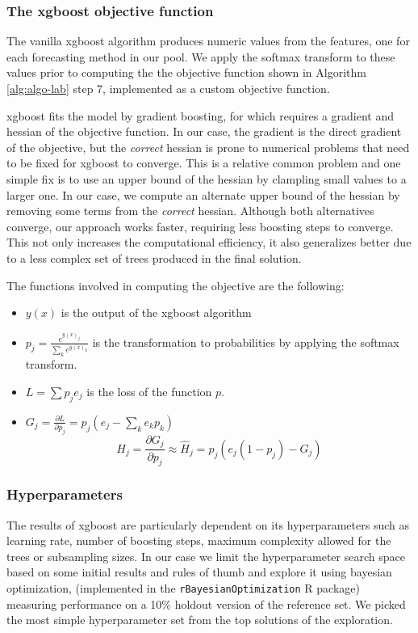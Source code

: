 \documentclass[11pt,a4paper,]{article}
\providecommand{\tightlist}{%
  \setlength{\itemsep}{0pt}\setlength{\parskip}{0pt}}
\theoremstyle{definition}
\theoremstyle{definition}
\theoremstyle{definition}
\theoremstyle{remark}
\begin{document}
\subsubsection{The xgboost objective
function}\label{the-xgboost-objective-function}

The vanilla xgboost algorithm produces numeric values from the features,
one for each forecasting method in our pool. We apply the softmax
transform to these values prior to computing the the objective function
shown in Algorithm \ref{alg:algo-lab} step 7, implemented as a custom
objective function.

xgboost fits the model by gradient boosting, for which requires a
gradient and hessian of the objective function. In our case, the
gradient is the direct gradient of the objective, but the \emph{correct}
hessian is prone to numerical problems that need to be fixed for xgboost
to converge. This is a relative common problem and one simple fix is to
use an upper bound of the hessian by clampling small values to a larger
one. In our case, we compute an alternate upper bound of the hessian by
removing some terms from the \emph{correct} hessian. Although both
alternatives converge, our approach works faster, requiring less
boosting steps to converge. This not only increases the computational
efficiency, it also generalizes better due to a less complex set of
trees produced in the final solution.

The functions involved in computing the objective are the following:

\begin{itemize}
\tightlist
\item
  \(y(x)\) is the output of the xgboost algorithm
\item
  \(p_j = \frac{e^{y(x)_j}}{ \sum_k e^{y(x)_k}}\) is the transformation
  to probabilities by applying the softmax transform.
\item
  \(L = \sum p_j e_j\) is the loss of the function \(p\).
\item
  \(G_j = \frac{\partial{L}}{\partial{p_j}} = p_j(e_j -\sum_k e_kp_k)\)
  \[ H_j = \frac{\partial{G_j}}{\partial{p_j}} \approx \hat{H}_j = p_j(e_j(1-p_j) - G_j)  \]
\end{itemize}

\subsubsection{Hyperparameters}\label{hyperparameters}

The results of xgboost are particularly dependent on its hyperparameters
such as learning rate, number of boosting steps, maximum complexity
allowed for the trees or subsampling sizes. In our case we limit the
hyperparameter search space based on some initial results and rules of
thumb and explore it using bayesian optimization, (implemented in the
\texttt{rBayesianOptimization} R package) measuring performance on a
10\% holdout version of the reference set. We picked the most simple
hyperparameter set from the top solutions of the exploration.
\end{document}
